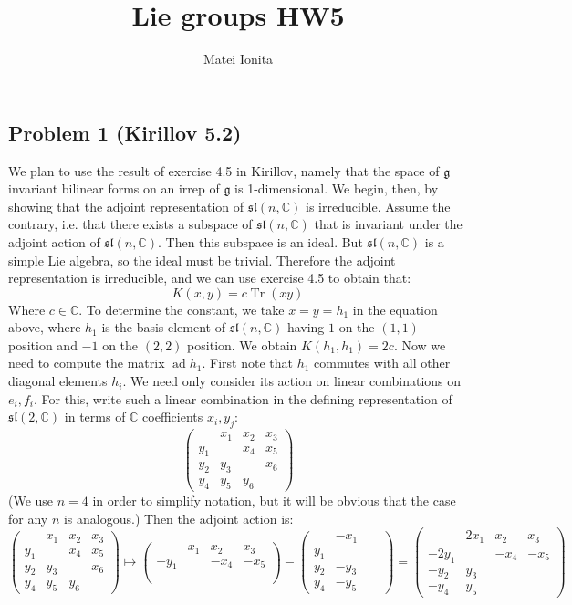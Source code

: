 \documentclass[12 pt]{article}
\title{Lie groups HW5}
\author{Matei Ionita}
\newcommand{\C}{\mathbb{C}}
\newcommand{\fr}{\mathfrak}
\DeclareMathOperator{\Tr}{Tr}
\DeclareMathOperator {\ad} {ad}
\begin{document}
  \maketitle

\subsection*{Problem 1 (Kirillov 5.2)}
We plan to use the result of exercise 4.5 in Kirillov, namely that the space of $\fr g$ invariant bilinear forms on an irrep of $\fr g$ is 1-dimensional. We begin, then, by showing that the adjoint representation of $\fr{sl}(n,\C)$ is irreducible. Assume the contrary, i.e. that there exists a subspace of $\fr{sl}(n,\C)$ that is invariant under the adjoint action of $\fr{sl}(n,\C)$. Then this subspace is an ideal. But $\fr{sl}(n,\C)$ is a simple Lie algebra, so the ideal must be trivial. Therefore the adjoint representation is irreducible, and we can use exercise 4.5 to obtain that:
\[         K(x,y) = c \Tr(xy)       \]
Where $c \in \C$. To determine the constant, we take $x = y = h_1$ in the equation above, where $h_1$ is the basis element of $\fr{sl}(n,\C)$ having $1$ on the $(1,1)$ position and $-1$ on the $(2,2)$ position. We obtain $K(h_1, h_1) = 2 c$. Now we need to compute the matrix $\ad h_1$. First note that $h_1$ commutes with all other diagonal elements $h_i$. We need only consider its action on linear combinations on $e_i, f_i$. For this, write such a linear combination in the defining representation of $\fr{sl}(2,\C)$ in terms of $\C$ coefficients $x_i,y_j$:
\[  \left(  \begin{array} {cccc}    & x_1 & x_2 & x_3 \\ y_1& &x_4 & x_5 \\ y_2&y_3 & & x_6 \\ y_4& y_5&y_6 &   \end{array} \right)      \]
(We use $n=4$ in order to simplify notation, but it will be obvious that the case for any $n$ is analogous.) Then the adjoint action is:
\[     \left(  \begin{array} {cccc}    & x_1 & x_2 & x_3 \\ y_1& &x_4 & x_5 \\ y_2&y_3 & & x_6 \\ y_4& y_5&y_6 &   \end{array} \right) \mapsto \left(  \begin{array} {cccc}    & x_1 & x_2 & x_3 \\ -y_1& &-x_4 & -x_5 \\ & & &  \\ & & &   \end{array} \right) - \left(  \begin{array} {cccc}    & -x_1 & & \\ y_1& & & \\ y_2&-y_3 & &  \\ y_4& -y_5& &   \end{array} \right) =  \left(  \begin{array} {cccc}    & 2x_1 & x_2 & x_3 \\ -2y_1& &-x_4 & -x_5 \\ -y_2&y_3 & &  \\ -y_4&y_5 & &   \end{array} \right) \]
\end{document}
